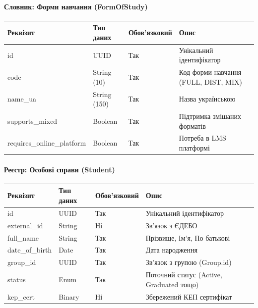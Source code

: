 \documentclass{article}
\begin{document}
\paragraph{Словник: Форми навчання (FormOfStudy)}
\begin{longtable}{p{3.5cm}p{3cm}p{2cm}p{5.5cm}}
\toprule
\textbf{Реквізит} & \textbf{Тип даних} & \textbf{Обов'язковий} & \textbf{Опис} \\
\midrule
id & UUID & Так & Унікальний ідентифікатор \\
code & String (10) & Так & Код форми навчання (FULL, DIST, MIX) \\
name\_ua & String (150) & Так & Назва українською \\
supports\_mixed & Boolean & Так & Підтримка змішаних форматів \\
requires\_online\_platform& Boolean & Так & Потреба в LMS платформі \\
\bottomrule
\end{longtable}

\paragraph{Реєстр: Особові справи (Student)}
\begin{longtable}{p{3.5cm}p{3cm}p{2cm}p{5.5cm}}
\toprule
\textbf{Реквізит} & \textbf{Тип даних} & \textbf{Обов'язковий} & \textbf{Опис} \\
\midrule
id & UUID & Так & Унікальний ідентифікатор \\
external\_id & String & Ні & Зв'язок з ЄДЕБО \\
full\_name & String & Так & Прізвище, Ім'я, По батькові \\
date\_of\_birth & Date & Так & Дата народження \\
group\_id & UUID & Так & Зв'язок з групою (Group.id) \\
status & Enum & Так & Поточний статус (Active, Graduated тощо) \\
kep\_cert & Binary & Ні & Збережений КЕП сертифікат \\
\bottomrule
\end{longtable}
\end{document}
